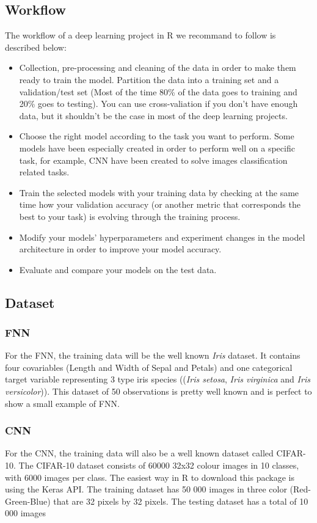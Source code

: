 \documentclass[letter,8pt]{article}\usepackage[]{graphicx}\usepackage[]{color}
\begin{document}
\subsection{Workflow}
The workflow of a deep learning project in R we recommand to follow is described below:
\begin{itemize}
\item Collection, pre-processing and cleaning of the data in order to make them ready to train the model. Partition the data into a training set and a validation/test set (Most of the time 80\% of the data goes to training and 20\% goes to testing). You can use cross-valiation if you don't have enough data, but it shouldn't be the case in most of the deep learning projects.
\item Choose the right model according to the task you want to perform. Some models have been especially created in order to perform well on a specific task, for example, CNN have been created to solve images classification related tasks.
\item Train the selected models with your training data by checking at the same time how your validation accuracy (or another metric that corresponds the best to your task) is evolving through the training process.
\item Modify your models' hyperparameters and experiment changes in the model architecture in order to improve your model accuracy.
\item Evaluate and compare your models on the test data.
\end{itemize}
\subsection{Dataset}
\subsubsection{FNN}
For the FNN, the training data will be the well known \textit{Iris} dataset. It contains four covariables (Length and Width of Sepal and Petals) and one categorical target variable representing 3 type iris species ((\textit{Iris setosa}, \textit{Iris virginica} and \textit{Iris versicolor})).  This dataset of 50 observations is pretty well known and is perfect to show a small example of FNN. 

\subsubsection{CNN}
For the CNN, the training data will also be a well known dataset called CIFAR-10. The CIFAR-10 dataset consists of 60000 32x32 colour images in 10 classes, with 6000 images per class. The easiest way in R to download this package is using the Keras API. The training dataset has 50 000 images in three color (Red-Green-Blue) that are 32 pixels by 32 pixels. The testing dataset has a total of 10 000 images
\end{document}
